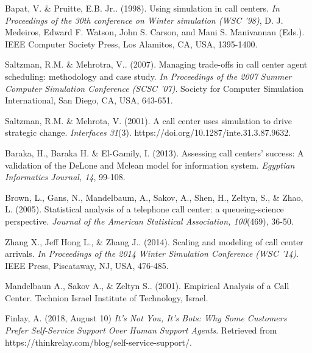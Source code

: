 \documentclass[12pt,twocolumn]{article}
\begin{document}
\newpage
\clearpage
{}
\begin{thebibliography}{8}
	
	Bapat, V. \& Pruitte, E.B. Jr.. (1998). Using simulation in call centers. \textit{In Proceedings of the 30th conference on Winter simulation (WSC '98)}, D. J. Medeiros, Edward F. Watson, John S. Carson, and Mani S. Manivannan (Eds.). IEEE Computer Society Press, Los Alamitos, CA, USA, 1395-1400.
	
	Saltzman, R.M. \& Mehrotra, V.. (2007). Managing trade-offs in call center agent scheduling: methodology and case study. \textit{In Proceedings of the 2007 Summer Computer Simulation Conference (SCSC '07)}. Society for Computer Simulation International, San Diego, CA, USA, 643-651.
	
	Saltzman, R.M. \& Mehrota, V. (2001). A call center uses simulation to drive strategic change. \textit{Interfaces 31}(3). https://doi.org/10.1287/inte.31.3.87.9632.
	
	
	Baraka, H., Baraka H. \& El-Gamily, I. (2013). Assessing call centers' success: A validation of the DeLone and Mclean model for information system. \textit{Egyptian Informatics Journal, 14}, 99-108.

	Brown, L., Gans, N., Mandelbaum, A., Sakov, A., Shen, H., Zeltyn, S., \& Zhao, L. (2005). Statistical analysis of a telephone call center: a queueing-science perspective. \textit{Journal of the American Statistical Association, 100}(469), 36-50.

	Zhang X., Jeff Hong L., \& Zhang J.. (2014). Scaling and modeling of call center arrivals. \textit{In Proceedings of the 2014 Winter Simulation Conference (WSC '14)}. IEEE Press, Piscataway, NJ, USA, 476-485.

	Mandelbaun A., Sakov A., \& Zeltyn S.. (2001). Empirical Analysis of a Call Center. Technion Israel Institute of Technology, Israel.
	
	Finlay, A. (2018, August 10) \textit{It’s Not You, It’s Bots: Why Some Customers Prefer Self-Service Support Over Human Support Agents}. Retrieved from https://thinkrelay.com/blog/self-service-support/.

\end{thebibliography}
\end{document}
